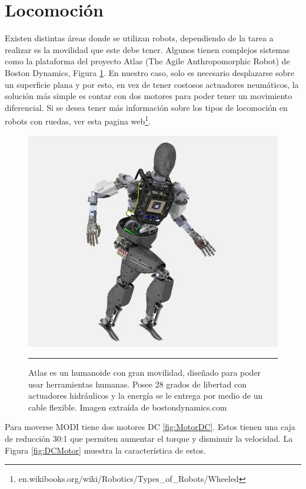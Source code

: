 
\section{Locomoción}
Existen distintas áreas donde se utilizan robots, dependiendo de la tarea a realizar es la movilidad que este debe tener. Algunos tienen complejos sistemas como la plataforma del proyecto Atlas (The Agile Anthropomorphic Robot) de Boston Dynamics, Figura \ref{fig:Atlas}. En nuestro caso, solo es necesario desplazarse sobre un superficie plana y por esto, en vez de tener costosos actuadores neumáticos, la solución más simple es contar con dos motores para poder tener un movimiento diferencial. Si se desea tener más información sobre los tipos de locomoción en robots con ruedas, ver esta pagina web\footnote{en.wikibooks.org/wiki/Robotics/Types\_of\_Robots/Wheeled}.


\begin{figure}[htbp]
	\centering
		\includegraphics[width=\textwidth]{./Figures/AtlasCADlr.jpg}
		\rule{35em}{0.5pt}
	\caption[Robot Atlas]{Atlas es un humanoide con gran movilidad, diseñado para poder usar herramientas humanas. Posee 28 grados de libertad con actuadores hidráulicos y la energía se le entrega por medio de un cable flexible. Imagen extraída de bostondynamics.com }
	\label{fig:Atlas}
\end{figure}


Para moverse MODI tiene dos motores DC \ref{fig:MotorDC}. Estos tienen una caja de reducción 30:1 que permiten aumentar el torque y disminuir la velocidad. La Figura \ref{fig:DCMotor} muestra la característica de estos. 

